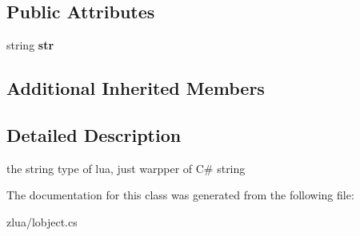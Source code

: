 \subsection*{Public Attributes}
\begin{DoxyCompactItemize}
\item 
\mbox{\label{classzlua_1_1_lua_1_1_t_string_ad01e8b782a4abfa385042be594ad0b1a}} 
string {\bfseries str}
\end{DoxyCompactItemize}
\subsection*{Additional Inherited Members}


\subsection{Detailed Description}
the string type of lua, just warpper of C\# string 



The documentation for this class was generated from the following file\+:\begin{DoxyCompactItemize}
\item 
zlua/lobject.\+cs\end{DoxyCompactItemize}
